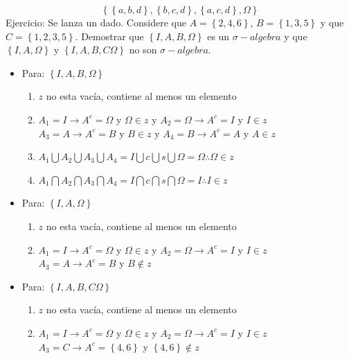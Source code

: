 \documentclass[11pt,fleqn]{book} %
\numberwithin{equation}{section} %
\numberwithin{figure}{section} %
\numberwithin{table}{section} %
\begin{document}
$$ \left\{ \left\{ a,b,d \right\}, \left\{ b,c,d \right\}, \left\{ a,c,d \right\}, \Omega  \right\}     $$
Ejercicio: Se lanza un dado. Considere que $A = \left\{ 2,4,6 \right\}$, $B = \left\{ 1,3,5 \right\}$ y que $C = \left\{ 1,2,3,5  \right\}$. Demostrar que $\left\{ I,A,B, \Omega \right\}$ es un $\sigma-algebra$ y que $\left\{ I,A, \Omega \right\}$ y $\left\{ I,A,B,C \Omega \right\}$ no son $\sigma-algebra$.
\begin{itemize}
    \item Para: $\left\{ I,A,B, \Omega \right\}$
    \begin{enumerate}
        \item $z$ no esta vacía, contiene al menos un elemento
        \item $A_{1} = I \rightarrow A^{c} = \Omega$ y  $\Omega \in z$ y 
        $A_{2} = \Omega \rightarrow A^{c} = I$ y  $I \in z$\\
        $A_{3} = A \rightarrow A^{c} = B$ y  $B \in z$ y 
        $A_{4} = B \rightarrow A^{c} = A$ y  $A \in z$
        \item $A_{1} \bigcup A_{2} \bigcup A_{3} \bigcup A_{4} = I \bigcup c \bigcup s \bigcup \Omega = \Omega \therefore \Omega \in z$
        \item $A_{1} \bigcap A_{2} \bigcap A_{3} \bigcap A_{4} = I \bigcap c \bigcap s \bigcap \Omega = I \therefore I \in z$
    \end{enumerate}
    \item Para: $\left\{ I,A, \Omega \right\}$
    \begin{enumerate}
        \item $z$ no esta vacía, contiene al menos un elemento
        \item $A_{1} = I \rightarrow A^{c} = \Omega$ y  $\Omega \in z$ y 
        $A_{2} = \Omega \rightarrow A^{c} = I$ y  $I \in z$\\
        $A_{3} = A \rightarrow A^{c} = B$ y  $B \notin z$
    \end{enumerate}    
    \item Para: $\left\{ I,A,B,C \Omega \right\}$
    \begin{enumerate}
        \item $z$ no esta vacía, contiene al menos un elemento
        \item $A_{1} = I \rightarrow A^{c} = \Omega$ y  $\Omega \in z$ y 
        $A_{2} = \Omega \rightarrow A^{c} = I$ y  $I \in z$\\
        $A_{3} = C \rightarrow A^{c} =\left\{ 4,6 \right\} $ y  $ \left\{ 4,6 \right\} \notin z$ 
    \end{enumerate}    
\end{itemize}
\end{document}

